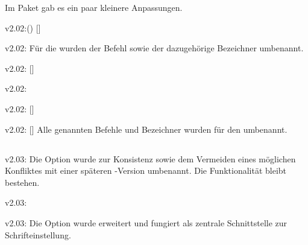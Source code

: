 Im Paket  gab es ein paar kleinere Anpassungen.
\begin{Bundle}{}
\begin{Obsolete}{v2.02:()}{%
  []%
}
\begin{Obsolete}{v2.02:}{}
\printobsoletelist%
%
Für die \taskname{} wurden der Befehl sowie der dazugehörige Bezeichner 
umbenannt.
\end{Obsolete}
\end{Obsolete}

\begin{Obsolete}{v2.02:}{%
  []%
}
\begin{Obsolete}{v2.02:}{}
\begin{Obsolete}{v2.02:}{%
  []%
}
\begin{Obsolete}{v2.02:}{%
  []%
}
\printobsoletelist%
%
Alle genannten Befehle und Bezeichner wurden für den \noticename{} umbenannt.
\end{Obsolete}
\end{Obsolete}
\end{Obsolete}
\end{Obsolete}
\end{Bundle}


\subsection{}
\begin{Obsolete}{v2.03:}{}
\printobsoletelist%
%
Die Option  wurde zur Konsistenz sowie dem Vermeiden 
eines möglichen Konfliktes mit einer späteren \KOMAScript-Version umbenannt. 
Die Funktionalität bleibt bestehen.
\end{Obsolete}

\begin{Obsolete}{v2.03:}{}
\begin{Obsolete}{v2.03:}{}
\printobsoletelist%
%
Die Option  wurde erweitert und fungiert als zentrale 
Schnittstelle zur Schrifteinstellung. 
\end{Obsolete}
\end{Obsolete}

